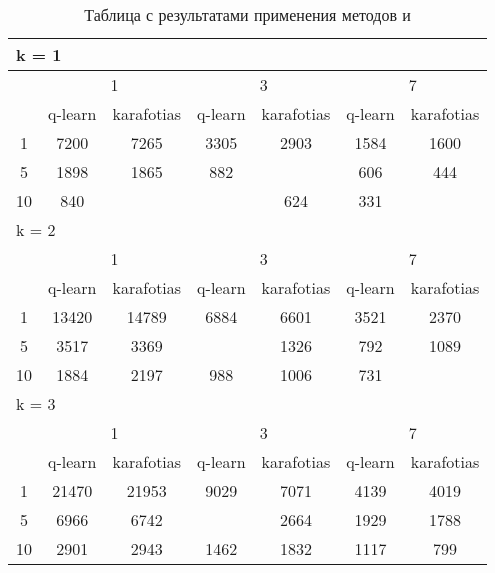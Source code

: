 \begin{table}
  \centering
  \begin{tabular}{|*7{c|}}
  \hline
  \multicolumn{7}{|l|}{k = 1} \\
  \hline
  \multirow{2}{*}{\diagbox{$\mu$}{$\lambda$}} & \multicolumn{2}{c|}{1} & \multicolumn{2}{c|}{3} & \multicolumn{2}{c|}{7} \\
  \cline{2-7}
  & q-learn & karafotias & q-learn & karafotias & q-learn & karafotias \\
  \hline
  1 & 7200 & 7265 & 3305 & 2903 & 1584 & 1600 \\
  \hline
  5 & 1898 & 1865 & 882 & \cellcolor{olive}{724} & 606 & 444 \\
  \hline
  10 & 840& \cellcolor{olive}{804} & \cellcolor{olive}{502} & 624 & 331 & \cellcolor{olive}{294} \\
  \hline
  \multicolumn{7}{|l|}{k = 2} \\
  \hline
  \multirow{2}{*}{\diagbox{$\mu$}{$\lambda$}} & \multicolumn{2}{c|}{1} & \multicolumn{2}{c|}{3} & \multicolumn{2}{c|}{7} \\
  \cline{2-7}
  & q-learn & karafotias & q-learn & karafotias & q-learn & karafotias \\
  \hline
  1 & 13420 & 14789 & 6884 & 6601 & 3521 & 2370 \\
  \hline
  5 & 3517 & 3369& \cellcolor{olive}{1031} & 1326 & 792 & 1089 \\
  \hline
  10 & 1884 & 2197 & 988 & 1006 & 731& \cellcolor{olive}{564} \\
  \hline
  \multicolumn{7}{|l|}{k = 3} \\
  \hline
  \multirow{2}{*}{\diagbox{$\mu$}{$\lambda$}} & \multicolumn{2}{c|}{1} & \multicolumn{2}{c|}{3} & \multicolumn{2}{c|}{7} \\
  \cline{2-7}
  & q-learn & karafotias & q-learn & karafotias & q-learn & karafotias \\
  \hline
  1 & 21470 & 21953 & 9029 & 7071 & 4139 & 4019 \\
  \hline
  5 & 6966 & 6742& \cellcolor{olive}{1467} & 2664 & 1929 & 1788 \\
  \hline
  10 & 2901 & 2943 & 1462 & 1832 & 1117 & 799 \\
  \hline
  \end{tabular}
  \captionsetup{justification=centering}
  \caption{Таблица с результатами применения методов  и }
\end{table}

